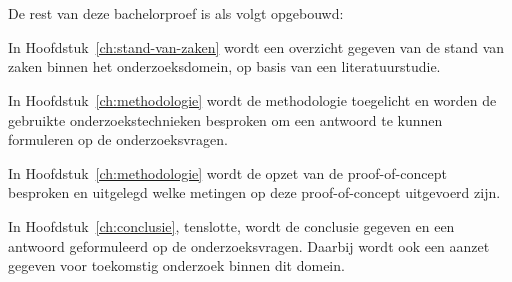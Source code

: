 \section{}%
\label{sec:opzet-bachelorproef}


De rest van deze bachelorproef is als volgt opgebouwd:

In Hoofdstuk~\ref{ch:stand-van-zaken} wordt een overzicht gegeven van de stand van zaken binnen het onderzoeksdomein, op basis van een literatuurstudie.

In Hoofdstuk~\ref{ch:methodologie} wordt de methodologie toegelicht en worden de gebruikte onderzoekstechnieken besproken om een antwoord te kunnen formuleren op de onderzoeksvragen.

In Hoofdstuk~\ref{ch:methodologie} wordt de opzet van de proof-of-concept besproken en uitgelegd welke metingen op deze proof-of-concept uitgevoerd zijn.

In Hoofdstuk~\ref{ch:conclusie}, tenslotte, wordt de conclusie gegeven en een antwoord geformuleerd op de onderzoeksvragen. Daarbij wordt ook een aanzet gegeven voor toekomstig onderzoek binnen dit domein.
